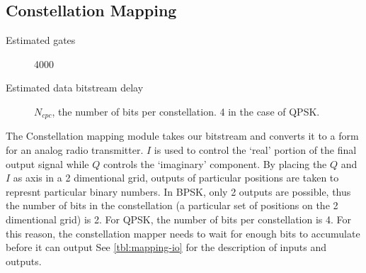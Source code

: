 

\subsection{Constellation Mapping}
\label{sec:constellation}


\begin{description}
	\item[Estimated gates] 4000
	\item[Estimated data bitstream delay] $N_{cpc}$, the number of bits per constellation. 4 in the case of QPSK.
\end{description}


The Constellation mapping module takes our bitstream and converts it to a form for an analog radio transmitter. $I$ is used to control the `real' portion of the final output signal while $Q$ controls the `imaginary' component. By placing the $Q$ and $I$ as axis in a 2 dimentional grid, outputs of particular positions are taken to represnt particular binary numbers. In BPSK, only 2 outputs are possible, thus the number of bits in the constellation (a particular set of positions on the 2 dimentional grid) is 2. For QPSK, the number of bits per constellation is 4. For this reason, the constellation mapper needs to wait for enough bits to accumulate before it can output 
See \autoref{tbl:mapping-io} for the description of inputs and outputs.

